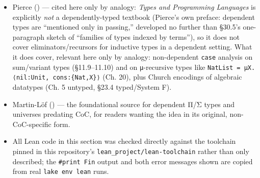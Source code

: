 \begin{itemize}
\item
  Pierce (\cite{Pierce2002}) --- cited here only by analogy: \emph{Types and Programming Languages} is explicitly \emph{not} a dependently-typed textbook (Pierce's own preface: dependent types are ``mentioned only in passing,'' developed no further than §30.5's one-paragraph sketch of ``families of types indexed by terms''), so it does not cover eliminators/recursors for inductive types in a dependent setting. What it does cover, relevant here only by analogy: non-dependent \texttt{case} analysis on sum/variant types (§11.9--11.10) and on \texttt{µ}-recursive types like \texttt{NatList = μX.⟨nil:Unit, cons:\{Nat,X\}⟩} (Ch. 20), plus Church encodings of algebraic datatypes (Ch. 5 untyped, §23.4 typed/System F).
\item
  Martin-Löf (\cite{MartinLof1984}) --- the foundational source for dependent Π/Σ types and universes predating CoC, for readers wanting the idea in its original, non-CoC-specific form.
\item
  All Lean code in this section was checked directly against the toolchain pinned in this repository's \texttt{lean\_\allowbreak{}project/\allowbreak{}lean-\allowbreak{}toolchain} rather than only described; the \texttt{\#print Fin} output and both error messages shown are copied from real \texttt{lake env lean} runs.
\end{itemize}
